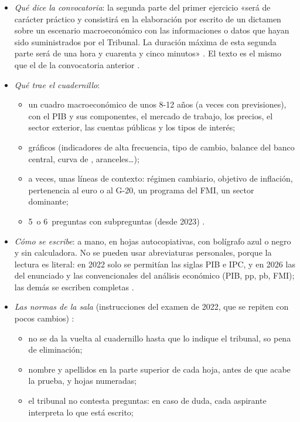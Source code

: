 \documentclass[11pt]{article}
\begin{document}
\begin{itemize}
\item \emph{Qué dice la convocatoria}: la segunda parte del primer ejercicio «será de carácter práctico y consistirá en la elaboración por escrito de un dictamen sobre un escenario macroeconómico con las informaciones o datos que hayan sido suministrados por el Tribunal. La duración máxima de esta segunda parte será de una hora y cuarenta y cinco minutos» \parencite{BOE2025ConvocatoriaTCEE}. El texto es el mismo que el de la convocatoria anterior \parencite{BOE2024ConvocatoriaTCEE}.
\item \emph{Qué trae el cuadernillo}:
  \begin{itemize}
  \item un cuadro macroeconómico de unos 8-12 años (a veces con previsiones), con el PIB y sus componentes, el mercado de trabajo, los precios, el sector exterior, las cuentas públicas y los tipos de interés;
  \item gráficos (indicadores de alta frecuencia, tipo de cambio, balance del banco central, curva de , aranceles…);
  \item a veces, unas líneas de contexto: régimen cambiario, objetivo de inflación, pertenencia al euro o al G-20, un programa del FMI, un sector dominante;
  \item 5~o 6~preguntas con subpreguntas (desde 2023) \parencite{ATCEE2026Examenes}.
  \end{itemize}
\item \emph{Cómo se escribe}: a mano, en hojas autocopiativas, con bolígrafo azul o negro y sin calculadora. No se pueden usar abreviaturas personales, porque la lectura es literal: en 2022 solo se permitían las siglas PIB e IPC, y en 2026 las del enunciado y las convencionales del análisis económico (PIB, pp, pb, FMI); las demás se escriben completas \parencite{ATCEE2026Examenes}.
\item \emph{Las normas de la sala} (instrucciones del examen de 2022, que se repiten con pocos cambios) \parencite{ATCEE2026Examenes}:
  \begin{itemize}
  \item no se da la vuelta al cuadernillo hasta que lo indique el tribunal, so pena de eliminación;
  \item nombre y apellidos en la parte superior de cada hoja, antes de que acabe la prueba, y hojas numeradas;
  \item el tribunal no contesta preguntas: en caso de duda, cada aspirante interpreta lo que está escrito;

\end{itemize}
\end{itemize}
\end{document}
